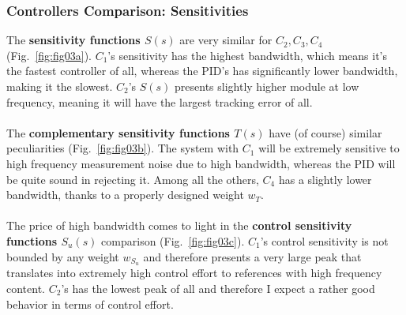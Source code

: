 \documentclass[a4paper, 12pt]{article}
\begin{document}
\subsubsection{Controllers Comparison: Sensitivities}
The \textbf{sensitivity functions $S(s)$} are very similar for $C_2, C_3, C_4$ (Fig.~\ref{fig:fig03a}). $C_1$'s sensitivity has the highest bandwidth, which means it's the fastest controller of all, whereas the PID's has significantly lower bandwidth, making it the slowest.
$C_2$'s $S(s)$ presents slightly higher module at low frequency, meaning it will have the largest tracking error of all.
\\\\
The \textbf{complementary sensitivity functions $T(s)$} have (of course) similar peculiarities (Fig.~\ref{fig:fig03b}). The system with $C_1$ will be extremely sensitive to high frequency measurement noise due to high bandwidth, whereas the PID will be quite sound in rejecting it. Among all the others, $C_4$ has a slightly lower bandwidth, thanks to a properly designed weight $w_T$.
\\\\
The price of high bandwidth comes to light in the \textbf{control sensitivity functions $S_u(s)$} comparison (Fig.~\ref{fig:fig03c}). $C_1$'s control sensitivity is not bounded by any weight $w_{S_u}$ and therefore presents a very large peak that translates into extremely high control effort to references with high frequency content. $C_2$'s has the lowest peak of all and therefore I expect a rather good behavior in terms of control effort.
\end{document}
